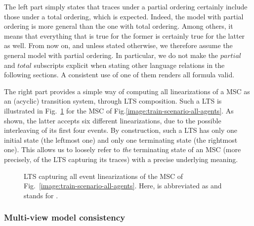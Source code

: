 The left part simply states that traces under a partial ordering certainly include those under a total ordering, which is expected. Indeed, the model with partial ordering is more general than the one with total ordering. Among others, it means that everything that is true for the former is certainly true for the latter as well. From now on, and unless stated otherwise, we therefore assume the general model with partial ordering. In particular, we do not make the $partial$ and $total$ subscripts explicit when stating other language relations in the following sections. A consistent use of one of them renders all formula valid.

The right part provides a simple way of computing all linearizations of a MSC as an (acyclic) transition system, through LTS composition. Such a LTS is illustrated in Fig.~\ref{image:msc-linearizations} for the MSC of Fig.\ref{image:train-scenario-all-agents}. As shown, the latter accepts six different linearizations, due to the possible interleaving of its first four events. By construction, such a LTS has only one initial state (the leftmost one) and only one terminating state (the rightmost one). This allows us to loosely refer to \emph{the} terminating state of an MSC (more precisely, of the LTS capturing its traces) with a precise underlying meaning.


\begin{figure}\centering
{}
\caption{LTS capturing all event linearizations of the MSC of Fig.~\ref{image:train-scenario-all-agents}. Here,  is abbreviated as  and  stands for . \label{image:msc-linearizations}}
\end{figure}

\subsubsection*{Multi-view model consistency}

